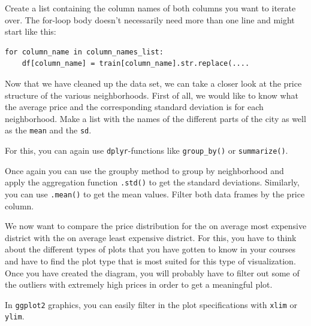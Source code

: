 \documentclass[
  11pt,
]{article}
\newenvironment{tips}[1]
  {
  \begin{itemize}
  \footnotesize
  \renewcommand{\labelitemi}{
    \raisebox{-.7\height}[0pt][0pt]{
      {\setkeys{Gin}{width=3em,keepaspectratio}
        \texttt{[image: images/\#1.png]}}
    }
  }
  \setlength{\fboxsep}{1em}
  \begin{rbox}
  \item
  }
  {
  \end{rbox}
  \end{itemize}
  }
\newenvironment{tipsp}[1]
  {
  \begin{itemize}
  \footnotesize
  \renewcommand{\labelitemi}{
    \raisebox{-.7\height}[0pt][0pt]{
      {\setkeys{Gin}{width=3em,keepaspectratio}
        \texttt{[image: images/\#1.png]}}
    }
  }
  \setlength{\fboxsep}{1em}
  \begin{pbox}
  \item
  }
  {
  \end{pbox}
  \end{itemize}
  }
\begin{document}
\begin{tipsp}p

Create a list containing the column names of both columns you want to iterate over.
The for-loop body doesn't necessarily need more than one line and might start like this:

\begin{verbatim}
for column_name in column_names_list:
    df[column_name] = train[column_name].str.replace(....
\end{verbatim}

\end{tipsp}

Now that we have cleaned up the data set, we can take a closer look at the price structure of the various neighborhoods. First of all, we would like to know what the average price and the corresponding standard deviation is for each neighborhood. Make a list with the names of the different parts of the city as well as the \texttt{mean} and the \texttt{sd}.

\begin{tips}r

For this, you can again use \texttt{dplyr}-functions like \texttt{group\_by()} or \texttt{summarize()}.

\end{tips}

\begin{tipsp}p

Once again you can use the groupby method to group by neighborhood and apply the aggregation function \texttt{.std()} to get the standard deviations. Similarly, you can use \texttt{.mean()} to get the mean values. Filter both data frames by the price column.

\end{tipsp}

We now want to compare the price distribution for the on average most expensive district with the on average least expensive district. For this, you have to think about the different types of plots that you have gotten to know in your courses and have to find the plot type that is most suited for this type of visualization. Once you have created the diagram, you will probably have to filter out some of the outliers with extremely high prices in order to get a meaningful plot.

\begin{tips}r

In \texttt{ggplot2} graphics, you can easily filter in the plot specifications with \texttt{xlim} or \texttt{ylim}.

\end{tips}
\end{document}
